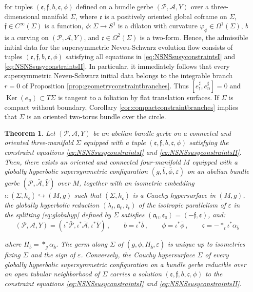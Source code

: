\documentclass[10pt,reqno,a4paper]{amsart}
\theoremstyle{plain}
\newtheorem{thm}{Theorem}[section]
\theoremstyle{definition}
\theoremstyle{remark}
\theoremstyle{remark}
\def\cA{\mathcal{A}}
\def\cP{\mathcal{P}}
\def\frc{\mathfrak{c}}
\def\fra{\mathfrak{a}}
\def\fre{\mathfrak{e}}
\newcommand{\Ker}{\operatorname{Ker}}
\renewcommand{\(}{ (}
\renewcommand{\)}{ )}
\newcommand{\frf}{\mathfrak{f}}
\begin{document}
\noindent
for tuples $(\fre,\frf,b,\frc,\phi)$ defined on a bundle gerbe $(\cP,\cA,Y)$ over a three-dimensional manifold $\Sigma$, where $\fre$ is a positively oriented global coframe on $\Sigma$, $\frf \in C^{\infty}(\Sigma)$ is a function, $\phi\colon \Sigma \to S^1$ is a dilaton with curvature $\varphi_{\phi}\in \Omega^1(\Sigma)$, $b$ is a curving on $(\cP,\cA,Y)$, and $\frc\in \Omega^2(\Sigma)$ is a two-form. Hence, the admissible initial data for the supersymmetric Neveu-Schwarz evolution flow consists of tuples $(\fre,\frf,b, \frc ,\phi)$ satisfying all equations in \eqref{eq:NSNSsusyconstraintsI} and \eqref{eq:NSNSsusyconstraintsII}. In particular, it immediately follows that every supersymmetric Neveu-Schwarz initial data belongs to the integrable branch $r=0$ of Proposition \ref{prop:geometryconstraintbranches}. Thus $[e^{\sharp}_{l},e^{\sharp}_{n}]=0$ and $\Ker(e_u)\subset T\Sigma$ is tangent to a foliation by flat translation surfaces.  If $\Sigma$ is compact without boundary, Corollary \ref{cor:compactconstraintbranches} implies that $\Sigma$ is an oriented two-torus bundle over the circle.

\begin{thm}
\label{thm:wellposedFinalSusy}
Let $(\cP,\cA,Y)$ be an abelian bundle gerbe on a connected and oriented three-manifold $\Sigma$ equipped with a tuple $(\fre,\frf,b,\frc,\phi)$ satisfying the constraint equations \eqref{eq:NSNSsusyconstraintsI} and \eqref{eq:NSNSsusyconstraintsII}. Then, there exists an oriented and connected four-manifold $M$ equipped with a globally hyperbolic supersymmetric configuration $(g,\bar{b},\bar{\phi},\varepsilon)$ on an abelian bundle gerbe $(\bar{\cP},\bar{\cA},\bar{Y})$ over $M$, together with an isometric embedding $\iota\colon (\Sigma,h_{\fre})\hookrightarrow (M,g)$ such that $(\Sigma,h_{\fre})$ is a Cauchy hypersurface in $(M,g)$, the globally hyperbolic reduction $(\lambda_t,\fra_t,\fre_t)$ of the isotropic parallelism of $\varepsilon$ in the splitting \eqref{eq:globahyp} defined by $\Sigma$ satisfies $(\fra_0,\fre_0) = (-\frf,\fre)$, and:
\begin{equation*}
(\cP,\cA,Y) = (\iota^{\ast}\bar{\cP},\iota^{\ast}\bar{\cA},\iota^{\ast}\bar{Y}) \, , \qquad  b = \iota^{\ast}\bar{b}\, , \qquad \phi = \iota^{\ast}\bar{\phi}\, , \qquad \frc = - \ast_{\fre} \iota^{\ast}\alpha_{\bar{b}}
\end{equation*}

\noindent
where $H_{\bar{b}} = \ast_g \alpha_{\bar{b}}$. The germ along $\Sigma$ of $(g,\bar{\phi},H_{\bar{b}},\varepsilon)$ is unique up to isometries fixing $\Sigma$ and the sign of $\varepsilon$. Conversely, the Cauchy hypersurface $\Sigma$ of every globally hyperbolic supersymmetric configuration on a bundle gerbe reducible over an open tubular neighborhood of $\Sigma$ carries a solution $(\fre,\frf,b,\frc,\phi)$ to the constraint equations \eqref{eq:NSNSsusyconstraintsI} and \eqref{eq:NSNSsusyconstraintsII}.
\end{thm}
\end{document}
